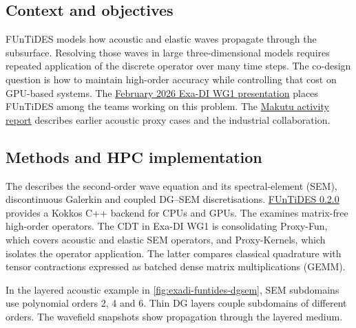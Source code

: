 \subsection{Context and objectives}

FUnTiDES models how acoustic and elastic waves propagate through the
subsurface. Resolving those waves in large three-dimensional models
requires repeated application of the discrete operator over many time
steps. The co-design question is how to maintain high-order accuracy
while controlling that cost on GPU-based systems. The
\href{https://numpex.org/wp-content/uploads/sites/6/2026/03/High-Performance-Spectral-Element-Operators-on-GPUs-.pdf}{February 2026 Exa-DI WG1 presentation}
places FUnTiDES among the teams working on this problem. The
\href{https://radar.inria.fr/report/2025/makutu/index.html}{Makutu activity report}
describes earlier acoustic proxy cases and the industrial collaboration.

\subsection{Methods and HPC implementation}

The
describes the second-order wave equation and its spectral-element (SEM),
discontinuous Galerkin and coupled DG--SEM discretisations.
\href{https://github.com/FUnTiDES-sim/FUnTiDES/releases/tag/0.2.0}{FUnTiDES 0.2.0}
provides a Kokkos C++ backend for CPUs and GPUs. The
examines matrix-free high-order operators. The CDT in Exa-DI WG1 is
consolidating Proxy-Fun, which covers acoustic and elastic SEM operators,
and Proxy-Kernels, which isolates the operator application. The latter
compares classical quadrature with tensor contractions expressed as
batched dense matrix multiplications (GEMM).

In the layered acoustic example in \cref{fig:exadi-funtides-dgsem},
SEM subdomains use polynomial orders 2, 4 and 6. Thin DG layers
couple subdomains of different orders. The wavefield snapshots show
propagation through the layered medium.

